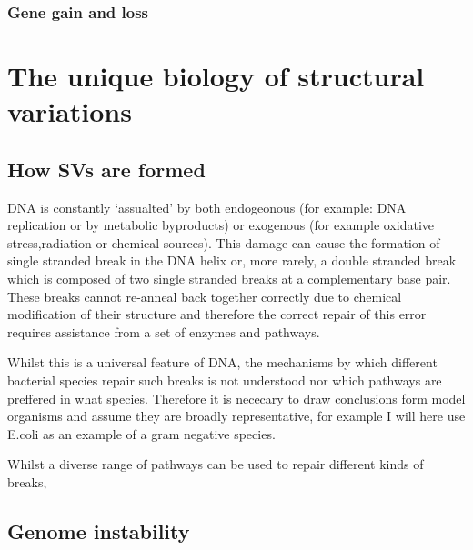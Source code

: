 \documentclass{article}
\begin{document}
 

\subsubsection{Gene gain and loss}

\section{The unique biology of structural variations}
\subsection{How SVs are formed}
DNA is constantly `assualted' by both endogeonous (for example: DNA replication or by metabolic byproducts) or exogenous (for example oxidative stress,radiation or chemical sources). This damage can cause the formation of single stranded break in the DNA helix or, more rarely, a double stranded break which is composed of two single stranded breaks at a complementary base pair. These breaks cannot re-anneal back together correctly due to chemical modification of their structure and therefore the correct repair of this error requires assistance from a set of enzymes and pathways. 


Whilst this is a universal feature of DNA, the mechanisms by which different bacterial species repair such breaks is not understood nor which pathways are preffered in what species. Therefore it is nececary to draw conclusions form model organisms and assume they are broadly representative, for example I will here use E.coli as an example of a gram negative species. 

Whilst a diverse range of pathways can be used to repair different kinds of breaks, 
\subsection{Genome instability}



\end{document}
